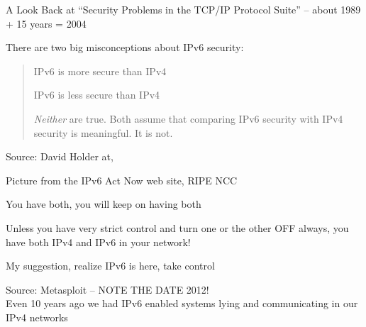 \documentclass[Screen16to9,17pt]{foils}
\begin{document}
A Look Back at “Security Problems in the TCP/IP Protocol Suite” -- about 1989 + 15 years = 2004




There are two big misconceptions about IPv6 security:

\begin{quote}
\begin{list2}
\item IPv6 is more secure than IPv4
\item IPv6 is less secure than IPv4
\end{list2}

\emph{Neither} are true. Both assume that comparing IPv6 security with IPv4 security is meaningful. It is not.
\end{quote}
Source: David Holder at, 



Picture from the IPv6 Act Now web site, RIPE NCC

\begin{list2}
\item You have both, you will keep on having both
\item Unless you have very strict control and turn one or the other OFF always, you have both IPv4 and IPv6 in your network!
\item My suggestion, realize IPv6 is here, take control
\end{list2}


\slide{}

Source: Metasploit -- NOTE THE DATE 2012!\\
Even 10 years ago we had IPv6 enabled systems lying and communicating in our IPv4 networks








\begin{quote}

\end{quote}

\begin{list2}
    \item
\end{list2}
\end{document}
